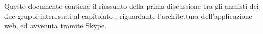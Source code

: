 Questo documento contiene il riassunto della prima discussione tra gli analisti dei due gruppi interessati al capitolato \progetto, riguardante l'architettura dell'applicazione web, ed avvenuta tramite Skype.

